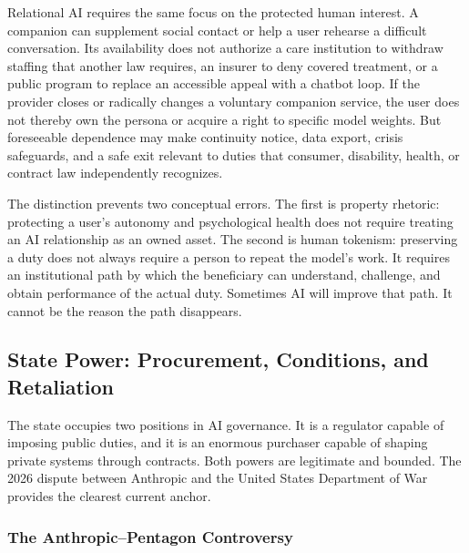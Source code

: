 Relational AI requires the same focus on the protected human interest. A companion can supplement social contact or help a user rehearse a difficult conversation. Its availability does not authorize a care institution to withdraw staffing that another law requires, an insurer to deny covered treatment, or a public program to replace an accessible appeal with a chatbot loop. If the provider closes or radically changes a voluntary companion service, the user does not thereby own the persona or acquire a right to specific model weights. But foreseeable dependence may make continuity notice, data export, crisis safeguards, and a safe exit relevant to duties that consumer, disability, health, or contract law independently recognizes.

The distinction prevents two conceptual errors. The first is property rhetoric: protecting a user's autonomy and psychological health does not require treating an AI relationship as an owned asset. The second is human tokenism: preserving a duty does not always require a person to repeat the model's work. It requires an institutional path by which the beneficiary can understand, challenge, and obtain performance of the actual duty. Sometimes AI will improve that path. It cannot be the reason the path disappears.

\subsection{State Power: Procurement, Conditions, and Retaliation}

The state occupies two positions in AI governance. It is a regulator capable of imposing public duties, and it is an enormous purchaser capable of shaping private systems through contracts. Both powers are legitimate and bounded. The 2026 dispute between Anthropic and the United States Department of War provides the clearest current anchor.

\subsubsection{The Anthropic--Pentagon Controversy}

